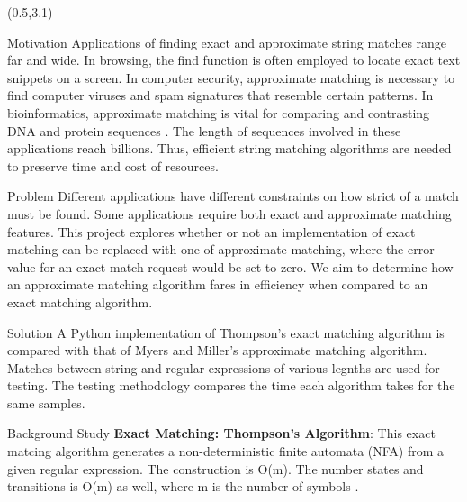 \documentclass[22pt]{beamer}
\begin{document}
\begin{frame}[fragile]
\begin{textblock}{7.25}(0.5,3.1)

\begin{block}{Motivation}
Applications of finding exact and approximate string matches range far and wide. In browsing, the find function is often employed to locate exact text snippets on a screen. In computer security, approximate matching is necessary to find computer viruses and spam signatures that resemble certain patterns. In bioinformatics, approximate matching is vital for comparing and contrasting DNA and protein sequences \cite{Approx1}. The length of sequences involved in these applications reach billions. Thus, efficient string matching algorithms are needed to preserve time and cost of resources.
\end{block}

\begin{block}{Problem}
 Different applications have different constraints on how strict of a match must be found. Some applications require both exact and approximate matching features. This project explores whether or not an implementation of exact matching can be replaced with one of approximate matching, where the error value for an exact match request would be set to zero. We aim to determine how an approximate matching algorithm fares in efficiency when compared to an exact matching algorithm.  

\end{block}

\begin{block}{Solution}
A Python implementation of Thompson's exact matching algorithm is compared with that of Myers and Miller's approximate matching algorithm. Matches between string and regular expressions of various legnths are used for testing. The testing methodology compares the time each algorithm takes for the same samples. 
\end{block}


\begin{block}{Background Study}
\textbf{Exact Matching: Thompson's Algorithm}: This exact matcing algorithm generates a non-deterministic finite automata (NFA) from a given regular expression. The construction is O(m). The number states and transitions is O(m) as well, where m is the number of symbols \cite{Approx1}.



\end{block}
\end{textblock}
\end{frame}
\end{document}
